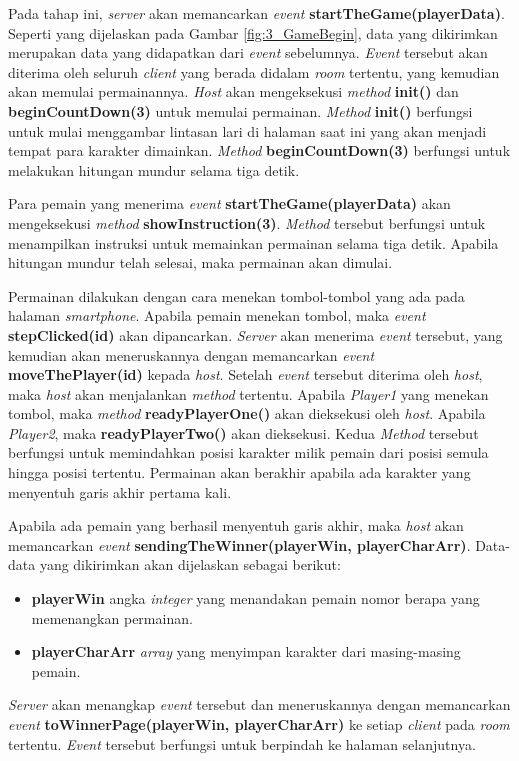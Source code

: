 Pada tahap ini, \textit{server} akan memancarkan \textit{event} \textbf{startTheGame(playerData)}. Seperti yang dijelaskan pada Gambar \ref{fig:3_GameBegin}, data yang dikirimkan merupakan data yang didapatkan dari \textit{event} sebelumnya. \textit{Event} tersebut akan diterima oleh seluruh \textit{client} yang berada didalam \textit{room} tertentu, yang kemudian akan memulai permainannya. \textit{Host} akan mengeksekusi \textit{method} \textbf{init()} dan \textbf{beginCountDown(3)} untuk memulai permainan. \textit{Method} \textbf{init()} berfungsi untuk mulai menggambar lintasan lari di halaman saat ini yang akan menjadi tempat para karakter dimainkan. \textit{Method} \textbf{beginCountDown(3)} berfungsi untuk melakukan hitungan mundur selama tiga detik. 

Para pemain yang menerima \textit{event} \textbf{startTheGame(playerData)} akan mengeksekusi \textit{method} \textbf{showInstruction(3)}. \textit{Method} tersebut berfungsi untuk menampilkan instruksi untuk memainkan permainan selama tiga detik. Apabila hitungan mundur telah selesai, maka permainan akan dimulai.

Permainan dilakukan dengan cara menekan tombol-tombol yang ada pada halaman \textit{smartphone}. Apabila pemain menekan tombol, maka \textit{event} \textbf{stepClicked(id)} akan dipancarkan. \textit{Server} akan menerima \textit{event} tersebut, yang kemudian akan meneruskannya dengan memancarkan \textit{event} \textbf{moveThePlayer(id)} kepada \textit{host}. Setelah \textit{event} tersebut diterima oleh \textit{host}, maka \textit{host} akan menjalankan \textit{method} tertentu. Apabila \textit{Player1} yang menekan tombol, maka \textit{method} \textbf{readyPlayerOne()} akan dieksekusi oleh \textit{host}. Apabila \textit{Player2}, maka \textbf{readyPlayerTwo()} akan dieksekusi. Kedua \textit{Method} tersebut berfungsi untuk memindahkan posisi karakter milik pemain dari posisi semula hingga posisi tertentu. Permainan akan berakhir apabila ada karakter yang menyentuh garis akhir pertama kali.

Apabila ada pemain yang berhasil menyentuh garis akhir, maka \textit{host} akan memancarkan \textit{event} \textbf{sendingTheWinner(playerWin, playerCharArr)}. Data-data yang dikirimkan akan dijelaskan sebagai berikut:
\begin{itemize}
	\item \textbf{playerWin} angka \textit{integer} yang menandakan pemain nomor berapa yang memenangkan permainan.
	\item \textbf{playerCharArr} \textit{array} yang menyimpan karakter dari masing-masing pemain.
\end{itemize}
\textit{Server} akan menangkap \textit{event} tersebut dan meneruskannya dengan memancarkan \textit{event} \textbf{toWinnerPage(playerWin, playerCharArr)} ke setiap \textit{client} pada \textit{room} tertentu. \textit{Event} tersebut berfungsi untuk berpindah ke halaman selanjutnya.

